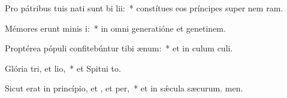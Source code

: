 \item Pro pátribus tuis nati sunt bi lii:~* constítues eos príncipes super nem ram.
\item Mémores erunt minis i:~* in omni generatióne et genetinem.
\item Proptérea pópuli confitebúntur tibi  ænum:~* et in culum culi.
\item Glória tri, et lio,~* et Spitui to.
\item Sicut erat in princípio, et , et per,~* et in sǽcula sæcurum. men.
